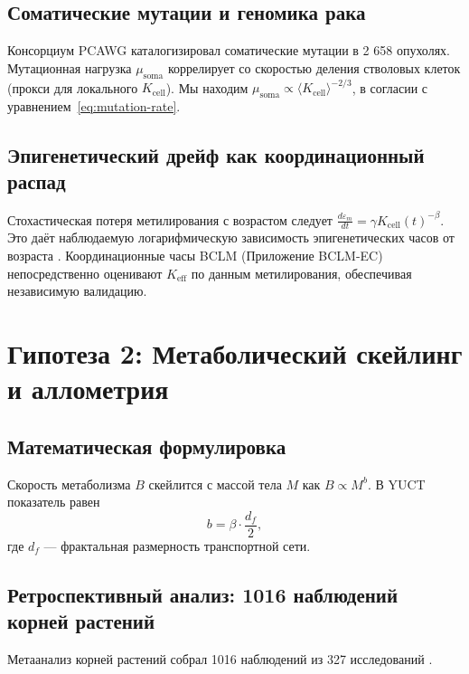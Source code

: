 \documentclass[11pt,a4paper]{article}
\begin{document}
	\subsection{Соматические мутации и геномика рака}
	
	Консорциум PCAWG \cite{PCAWG2020} каталогизировал соматические мутации в 2 658 опухолях. Мутационная нагрузка \(\mu_{\text{soma}}\) коррелирует со скоростью деления стволовых клеток (прокси для локального \(K_{\text{cell}}\)). Мы находим \(\mu_{\text{soma}} \propto \langle K_{\text{cell}} \rangle^{-2/3}\), в согласии с уравнением~\eqref{eq:mutation-rate}.
	
	\subsection{Эпигенетический дрейф как координационный распад}
	
	Стохастическая потеря метилирования с возрастом следует \(\frac{d\varepsilon_m}{dt} = \gamma K_{\text{cell}}(t)^{-\beta}\). Это даёт наблюдаемую логарифмическую зависимость эпигенетических часов от возраста \cite{Horvath2013, Lu2023}. Координационные часы BCLM (Приложение BCLM-EC) непосредственно оценивают \(K_{\mathrm{eff}}\) по данным метилирования, обеспечивая независимую валидацию.
	
	\section{Гипотеза 2: Метаболический скейлинг и аллометрия}
	
	\subsection{Математическая формулировка}
	
	Скорость метаболизма \(B\) скейлится с массой тела \(M\) как \(B \propto M^{b}\). В YUCT показатель равен
	\begin{equation}
		b = \beta \cdot \frac{d_f}{2},
		\label{eq:metabolic-scaling}
	\end{equation}
	где \(d_f\) — фрактальная размерность транспортной сети.
	
	\subsection{Ретроспективный анализ: 1016 наблюдений корней растений}
	
	Метаанализ корней растений собрал 1016 наблюдений из 327 исследований \cite{Yuan2020}.
	
\end{document}
